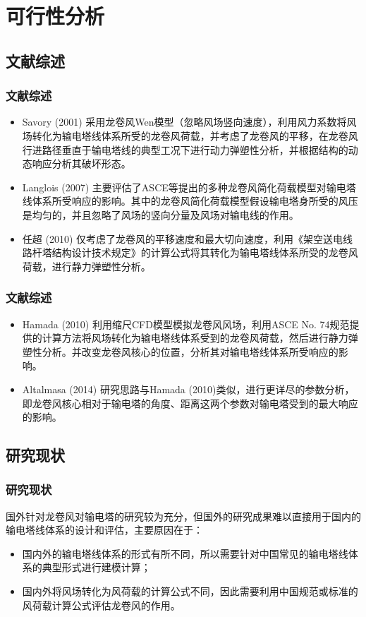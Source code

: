 \documentclass[]{beamer}
\begin{document}
\section{可行性分析}
\subsection{文献综述}
\begin{frame}
  \frametitle{文献综述}
  \begin{itemize}
  	\item<1->
  	Savory (2001) 采用龙卷风Wen模型（忽略风场竖向速度），利用风力系数将风场转化为输电塔线体系所受的龙卷风荷载，并考虑了龙卷风的平移，在龙卷风行进路径垂直于输电塔线的典型工况下进行动力弹塑性分析，并根据结构的动态响应分析其破坏形态。
  	\item<2->
  	Langlois (2007) 主要评估了ASCE等提出的多种龙卷风简化荷载模型对输电塔线体系所受响应的影响。其中的龙卷风简化荷载模型假设输电塔身所受的风压是均匀的，并且忽略了风场的竖向分量及风场对输电线的作用。
  	\item<3->
  	任超 (2010) 仅考虑了龙卷风的平移速度和最大切向速度，利用《架空送电线路杆塔结构设计技术规定》的计算公式将其转化为输电塔线体系所受的龙卷风荷载，进行静力弹塑性分析。
  \end{itemize}  
\end{frame}

\begin{frame}
	\frametitle{文献综述}
	\begin{itemize}
		\item<1->
		Hamada (2010) 利用缩尺CFD模型模拟龙卷风风场，利用ASCE No. 74规范提供的计算方法将风场转化为输电塔线体系受到的龙卷风荷载，然后进行静力弹塑性分析。并改变龙卷风核心的位置，分析其对输电塔线体系所受响应的影响。
		\item<2->
	    Altalmasa (2014) 研究思路与Hamada (2010)类似，进行更详尽的参数分析，即龙卷风核心相对于输电塔的角度、距离这两个参数对输电塔受到的最大响应的影响。
	\end{itemize}  
\end{frame}

\subsection{研究现状}
\begin{frame}
  \frametitle{研究现状}
  国外针对龙卷风对输电塔的研究较为充分，但国外的研究成果难以直接用于国内的输电塔线体系的设计和评估，主要原因在于：
  \begin{itemize}
    \item<2->
    国内外的输电塔线体系的形式有所不同，所以需要针对中国常见的输电塔线体系的典型形式进行建模计算；
    \item<3->
    国内外将风场转化为风荷载的计算公式不同，因此需要利用中国规范或标准的风荷载计算公式评估龙卷风的作用。
  \end{itemize}
\end{frame}
\end{document}
